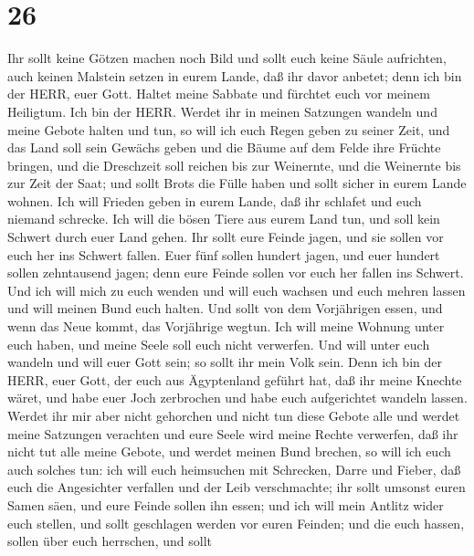 \hypertarget{section-25}{%
\section{26}\label{section-25}}

 Ihr sollt keine Götzen machen noch Bild und sollt euch
keine Säule aufrichten, auch keinen Malstein setzen in eurem Lande, daß
ihr davor anbetet; denn ich bin der HERR, euer Gott.  Haltet
meine Sabbate und fürchtet euch vor meinem Heiligtum. Ich bin der HERR.
 Werdet ihr in meinen Satzungen wandeln und meine Gebote
halten und tun,  so will ich euch Regen geben zu seiner
Zeit, und das Land soll sein Gewächs geben und die Bäume auf dem Felde
ihre Früchte bringen,  und die Dreschzeit soll reichen bis
zur Weinernte, und die Weinernte bis zur Zeit der Saat; und sollt Brots
die Fülle haben und sollt sicher in eurem Lande wohnen.  Ich
will Frieden geben in eurem Lande, daß ihr schlafet und euch niemand
schrecke. Ich will die bösen Tiere aus eurem Land tun, und soll kein
Schwert durch euer Land gehen.  Ihr sollt eure Feinde jagen,
und sie sollen vor euch her ins Schwert fallen.  Euer fünf
sollen hundert jagen, und euer hundert sollen zehntausend jagen; denn
eure Feinde sollen vor euch her fallen ins Schwert.  Und ich
will mich zu euch wenden und will euch wachsen und euch mehren lassen
und will meinen Bund euch halten.  Und sollt von dem
Vorjährigen essen, und wenn das Neue kommt, das Vorjährige wegtun.
 Ich will meine Wohnung unter euch haben, und meine Seele
soll euch nicht verwerfen.  Und will unter euch wandeln und
will euer Gott sein; so sollt ihr mein Volk sein.  Denn ich
bin der HERR, euer Gott, der euch aus Ägyptenland geführt hat, daß ihr
meine Knechte wäret, und habe euer Joch zerbrochen und habe euch
aufgerichtet wandeln lassen.  Werdet ihr mir aber nicht
gehorchen und nicht tun diese Gebote alle  und werdet meine
Satzungen verachten und eure Seele wird meine Rechte verwerfen, daß ihr
nicht tut alle meine Gebote, und werdet meinen Bund brechen,
 so will ich euch auch solches tun: ich will euch
heimsuchen mit Schrecken, Darre und Fieber, daß euch die Angesichter
verfallen und der Leib verschmachte; ihr sollt umsonst euren Samen säen,
und eure Feinde sollen ihn essen;  und ich will mein
Antlitz wider euch stellen, und sollt geschlagen werden vor euren
Feinden; und die euch hassen, sollen über euch herrschen, und sollt
